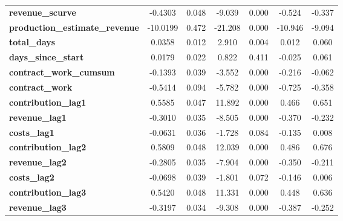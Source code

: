 \begin{center}
\begin{tabular}{lcccccc}
\textbf{revenue\_scurve}                    &      -0.4303  &        0.048     &    -9.039  &         0.000        &       -0.524    &       -0.337     \\
\textbf{production\_estimate\_revenue}      &     -10.0199  &        0.472     &   -21.208  &         0.000        &      -10.946    &       -9.094     \\
\textbf{total\_days}                        &       0.0358  &        0.012     &     2.910  &         0.004        &        0.012    &        0.060     \\
\textbf{days\_since\_start}                 &       0.0179  &        0.022     &     0.822  &         0.411        &       -0.025    &        0.061     \\
\textbf{contract\_work\_cumsum}             &      -0.1393  &        0.039     &    -3.552  &         0.000        &       -0.216    &       -0.062     \\
\textbf{contract\_work}                     &      -0.5414  &        0.094     &    -5.782  &         0.000        &       -0.725    &       -0.358     \\
\textbf{contribution\_lag1}                 &       0.5585  &        0.047     &    11.892  &         0.000        &        0.466    &        0.651     \\
\textbf{revenue\_lag1}                      &      -0.3010  &        0.035     &    -8.505  &         0.000        &       -0.370    &       -0.232     \\
\textbf{costs\_lag1}                        &      -0.0631  &        0.036     &    -1.728  &         0.084        &       -0.135    &        0.008     \\
\textbf{contribution\_lag2}                 &       0.5809  &        0.048     &    12.039  &         0.000        &        0.486    &        0.676     \\
\textbf{revenue\_lag2}                      &      -0.2805  &        0.035     &    -7.904  &         0.000        &       -0.350    &       -0.211     \\
\textbf{costs\_lag2}                        &      -0.0698  &        0.039     &    -1.801  &         0.072        &       -0.146    &        0.006     \\
\textbf{contribution\_lag3}                 &       0.5420  &        0.048     &    11.331  &         0.000        &        0.448    &        0.636     \\
\textbf{revenue\_lag3}                      &      -0.3197  &        0.034     &    -9.308  &         0.000        &       -0.387    &       -0.252     \\

\end{tabular}
\end{center}
